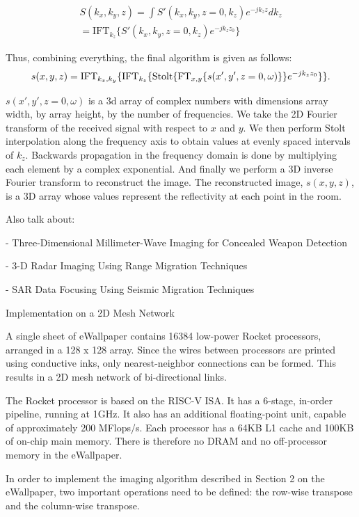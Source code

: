 \documentclass[twocolumn]{article}
\makeatletter
\def\section{\@startsection{section}{1}{\z@}{24pt plus 2 pt
minus 2 pt} {12pt plus 2pt minus 2pt}{\large\bf}}
\makeatother
\begin{document}
\begin{gather}
S(k_{x},k_{y},z)  =  \int S'(k_{x},k_{y},z=0,k_{z})e^{-jk_{z}z}dk_{z}\\
  =  \text{IFT}_{k_{z}}\{S'(k_{x},k_{y},z=0,k_{z})e^{-jk_{z}z_{0}}\}
\end{gather}

Thus, combining everything, the final algorithm is given as follows:
\[
s(x,y,z)=\text{IFT}_{k_{x},k_{y}}\{\text{IFT}_{k_{z}}\{\text{\text{Stolt}}\{\text{FT}_{x,y}\{s(x',y',z=0,\omega)\}\}e^{-jk_{z}z_{0}}\}\}.
\]

$s(x', y', z=0, \omega)$ is a 3d array of complex numbers with dimensions array width, by array height, by the number of frequencies. We take the 2D Fourier transform of the received signal with respect to $x$ and $y$. We then perform Stolt interpolation along the frequency axis to obtain values at evenly spaced intervals of $k_z$. Backwards propagation in the frequency domain is done by multiplying each element by a complex exponential. And finally we perform a 3D inverse Fourier transform to reconstruct the image. The reconstructed image, $s(x,y,z)$, is a 3D array whose values represent the reflectivity at each point in the room.

Also talk about:

- Three-Dimensional Millimeter-Wave Imaging for Concealed Weapon Detection

- 3-D Radar Imaging Using Range Migration Techniques

- SAR Data Focusing Using Seismic Migration Techniques

\section{Implementation on a 2D Mesh Network}

A single sheet of eWallpaper contains 16384 low-power Rocket processors, arranged in a 128 x 128 array. Since the wires between processors are printed using conductive inks, only nearest-neighbor connections can be formed. This results in a 2D mesh network of bi-directional links.

The Rocket processor is based on the RISC-V \cite{riscv} ISA. It has a 6-stage, in-order pipeline, running at 1GHz. It also has an additional floating-point unit, capable of approximately 200 MFlops/s. Each processor has a 64KB L1 cache and 100KB of on-chip main memory. There is therefore no DRAM and no off-processor memory in the eWallpaper.

In order to implement the imaging algorithm described in Section 2 on the eWallpaper, two important operations need to be defined: the row-wise transpose and the column-wise transpose.
\end{document}
